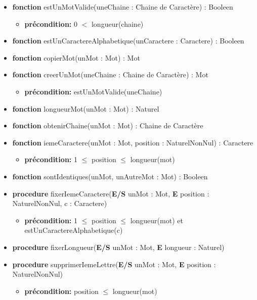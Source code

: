 	\begin{itemize}[label=$\ $, leftmargin=1cm]
		 \item \textbf{fonction} estUnMotValide(uneChaine : Chaine de Caractère) : Booleen
		 \begin{itemize}[label=$| $]
		\item \textbf{précondition:} 0 $<$ longueur(chaine)
	     \end{itemize}
		 \item \textbf{fonction} estUnCaractereAlphabetique(unCaractere : Caractere) : Booleen
		 \item \textbf{fonction} copierMot(unMot : Mot) : Mot
		 \item \textbf{fonction} creerUnMot(uneChaine : Chaine de Caractère) : Mot
		 \begin{itemize}[label=$| $]
		\item \textbf{précondition:} estUnMotValide(uneChaine)
	     \end{itemize}
		 \item \textbf{fonction} longueurMot(unMot : Mot) : Naturel
		 \item \textbf{fonction} obtenirChaine(unMot : Mot) : Chaine de Caractère
		 \item \textbf{fonction} iemeCaractere(unMot : Mot, position : NaturelNonNul) : Caractere
		 \begin{itemize}[label=$| $]
		\item \textbf{précondition:} 1 $\leq$ position $\leq$ longueur(mot)
	     \end{itemize}
	     \item \textbf{fonction} sontIdentiques(unMot, unAutreMot : Mot) : Booleen
	     \item \textbf{procedure} fixerIemeCaractere(\textbf{E/S} unMot : Mot, \textbf{E} position : NaturelNonNul, c : Caractere)
	     \begin{itemize}[label=$| $]
		\item \textbf{précondition:} 1 $\leq$ position $\leq$ longueur(mot) et estUnCaractereAlphabetique(c)
	     \end{itemize}
	     \item \textbf{procedure} fixerLongueur(\textbf{E/S} unMot : Mot, \textbf{E} longueur : Naturel)
	     \item \textbf{procedure} supprimerIemeLettre(\textbf{E/S} unMot : Mot, \textbf{E} position : NaturelNonNul)
	     \begin{itemize}[label=$| $]
		\item \textbf{précondition:} position $\leq$ longueur(mot)

\end{itemize}
\end{itemize}
